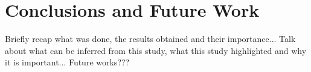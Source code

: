 \chapter{Conclusions and Future Work} \label{chap_5}


Briefly recap what was done, the results obtained and their importance...
\newline \newline
Talk about what can be inferred from this study, what this study highlighted and why it is important...
\newline \newline
Future works???

